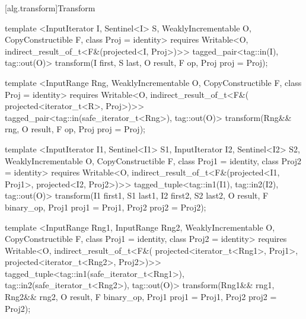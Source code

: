 [alg.transform]{Transform}

%
\begin{itemdecl}
template <InputIterator I, Sentinel<I> S, WeaklyIncrementable O,
    CopyConstructible F, class Proj = identity>
  requires Writable<O, indirect_result_of_t<F&(projected<I, Proj>)>>
  tagged_pair<tag::in(I), tag::out(O)>
    transform(I first, S last, O result, F op, Proj proj = Proj{});

template <InputRange Rng, WeaklyIncrementable O, CopyConstructible F,
    class Proj = identity>
  requires Writable<O, indirect_result_of_t<F&(
    projected<iterator_t<R>, Proj>)>>
  tagged_pair<tag::in(safe_iterator_t<Rng>), tag::out(O)>
    transform(Rng&& rng, O result, F op, Proj proj = Proj{});

template <InputIterator I1, Sentinel<I1> S1, InputIterator I2, Sentinel<I2> S2,
    WeaklyIncrementable O, CopyConstructible F, class Proj1 = identity,
    class Proj2 = identity>
  requires Writable<O, indirect_result_of_t<F&(projected<I1, Proj1>,
    projected<I2, Proj2>)>>
  tagged_tuple<tag::in1(I1), tag::in2(I2), tag::out(O)>
    transform(I1 first1, S1 last1, I2 first2, S2 last2, O result,
            F binary_op, Proj1 proj1 = Proj1{}, Proj2 proj2 = Proj2{});

template <InputRange Rng1, InputRange Rng2, WeaklyIncrementable O,
    CopyConstructible F, class Proj1 = identity, class Proj2 = identity>
  requires Writable<O, indirect_result_of_t<F&(
    projected<iterator_t<Rng1>, Proj1>, projected<iterator_t<Rng2>, Proj2>)>>
  tagged_tuple<tag::in1(safe_iterator_t<Rng1>),
               tag::in2(safe_iterator_t<Rng2>),
               tag::out(O)>
    transform(Rng1&& rng1, Rng2&& rng2, O result,
              F binary_op, Proj1 proj1 = Proj1{}, Proj2 proj2 = Proj2{});
\end{itemdecl}

